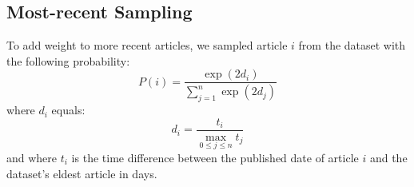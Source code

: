 \subsection{Most-recent Sampling}
To add weight to more recent articles, we sampled article $i$ from the dataset with the following probability:
\begin{equation*}
    P(i) = \frac{\exp(2 d_i)}{\sum_{j=1}^{n} \exp(2 d_j)}
\end{equation*}
where $d_i$ equals:
\begin{equation*}
    d_i = \frac{t_i}{\max_{0\le j \le n}{t_j}}
\end{equation*}
and where $t_i$ is the time difference between the published date of article $i$ and the dataset's eldest article in days.
